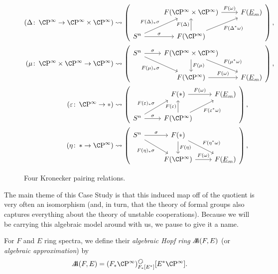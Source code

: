 \begin{figure}
\begin{align*}
(\Delta\co \CP^\infty \to \CP^\infty \times \CP^\infty) & \leadsto
\left(
\begin{tikzcd}[ampersand replacement=\&]
\& F(\CP^\infty \times \CP^\infty) \arrow["F(\omega)"]{r} \& F(\OS{E}{m}) \\
S^n \arrow["\sigma"]{r} \arrow["F(\Delta)_* \sigma"]{ru} \& F(\CP^\infty) \arrow["F(\Delta)"]{u} \arrow["F(\Delta^* \omega)"']{ru}
\end{tikzcd}
\right), \\
(\mu\co \CP^\infty \times \CP^\infty \to \CP^\infty) & \leadsto
\left(
\begin{tikzcd}[ampersand replacement=\&]
S^n \arrow["\sigma"]{r} \arrow["F(\mu)_* \sigma"']{rd} \& F(\CP^\infty \times \CP^\infty) \arrow["F(\mu)"]{d} \arrow["F(\mu^* \omega)"]{rd} \\
\& F(\CP^\infty) \arrow["F(\omega)"]{r} \& F(\OS{E}{m})
\end{tikzcd}
\right), \\
(\eps\co \CP^\infty \to *) & \leadsto
\left(
\begin{tikzcd}[ampersand replacement=\&]
\& F(*) \arrow["F(\omega)"]{r} \& F(\OS{E}{m}) \\
S^n \arrow["\sigma"]{r} \arrow["F(\eps)_* \sigma"]{ru} \& F(\CP^\infty) \arrow["F(\eps)"]{u} \arrow["F(\eps^* \omega)"']{ru}
\end{tikzcd}
\right), \\
(\eta\co * \to \CP^\infty) & \leadsto
\left(
\begin{tikzcd}[ampersand replacement=\&]
S^n \arrow["\sigma"]{r} \arrow["F(\eta)_* \sigma"']{rd} \& F(*) \arrow["F(\eta)"]{d} \arrow["F(\eta^* \omega)"]{rd} \\
\& F(\CP^\infty) \arrow["F(\omega)"]{r} \& F(\OS{E}{m})
\end{tikzcd}
\right),
\end{align*}
\caption{Four Kronecker pairing relations.}\label{KroneckerPairingFigure}
\end{figure}

The main theme of this Case Study is that this induced map off of the quotient is very often an isomorphism (and, in turn, that the theory of formal groups also captures everything about the theory of unstable cooperations).  Because we will be carrying this algebraic model around with us, we pause to give it a name.

\begin{definition}
For $F$ and $E$ ring spectra, we define their \textit{algebraic Hopf ring} $\AA(F, E)$ (or \textit{algebraic approximation}) by \[\AA(F, E) = (F_* \CP^\infty)_{F_*[E^*]}^{\circulatearrows}[E^* \CP^\infty].\]
\end{definition}

